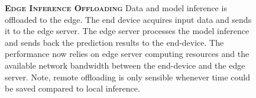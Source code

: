 \begin{figure}
	\begin{minipage}{0.3\linewidth}
		\centering
		\begin{figure}
			\centering
			\captionsetup[subfigure]{justification=centering}
		\end{figure}
	\end{minipage}
	\hfill
	\begin{minipage}{0.65\linewidth}
		\textbf{\protect{} \textsc{Edge Inference Offloading}}
		\color{caption-color} \newline
		Data and model inference is offloaded to the edge. The end device acquires input data and sends it to the edge server. The edge server processes the model inference and sends back the prediction results to the end-device. The performance now relies on edge server computing resources and the available network bandwidth between the end-device and the edge server. Note, remote offloading is only sensible whenever time could be saved compared to local inference.	\end{minipage}
\end{figure}

